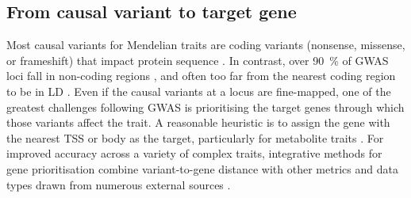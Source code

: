 \begin{outline}
%
%
%
%

\subsection{From causal variant to target gene}

Most causal variants for Mendelian traits are coding variants (nonsense, missense, or frameshift) that impact protein sequence \autocite{chong2015GeneticBasisMendelian}.
In contrast, over \SI{90}{\percent} of \gls{GWAS} loci fall in non-coding regions \autocite{gallagher2018PostGWASEraAssociation},
and often too far from the nearest coding region to be in \gls{LD} \autocite{brodie2016HowFarSNP}.
Even if the causal variants at a locus are fine-mapped, 
one of the greatest challenges following \gls{GWAS} is prioritising the target genes through which those variants affect the trait.
A reasonable heuristic is to assign the gene with the nearest \gls{TSS} or body as the target, particularly for metabolite traits \autocite{stacey2019ProGeMFrameworkPrioritization}.
For improved accuracy across a variety of complex traits,
integrative methods for gene prioritisation combine variant-to-gene distance with other metrics and data types drawn from numerous external sources \autocite{stacey2019ProGeMFrameworkPrioritization,forgetta2020EffectorIndexPredict,ghoussaini2020OpenTargetsGenetics}.


\end{outline}
